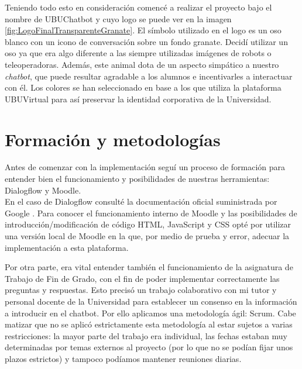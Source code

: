 Teniendo todo esto en consideración comencé a realizar el proyecto bajo el nombre de UBUChatbot y cuyo logo se puede ver en la imagen \ref{fig:LogoFinalTransparenteGranate}. El símbolo utilizado en el logo es un oso blanco con un icono de conversación sobre un fondo granate. Decidí utilizar un oso ya que era algo diferente a las siempre utilizadas imágenes de robots o teleoperadoras. Además, este animal dota de un aspecto simpático a nuestro \textit{chatbot}, que puede resultar agradable a los alumnos e incentivarles a interactuar con él. Los colores se han seleccionado en base a los que utiliza la plataforma UBUVirtual para así preservar la identidad corporativa de la Universidad.

\newpage

\section{Formación y metodologías}

Antes de comenzar con la implementación seguí un proceso de formación para entender bien el funcionamiento y posibilidades de nuestras herramientas: Dialogflow y Moodle. \\
En el caso de Dialogflow consulté la documentación oficial suministrada por Google \cite{DialogflowDocs}. Para conocer el funcionamiento interno de Moodle y las posibilidades de introducción/modificación de código HTML, JavaScript y CSS opté por utilizar una versión local de Moodle en la que, por medio de prueba y error, adecuar la implementación a esta plataforma.

Por otra parte, era vital entender también el funcionamiento de la asignatura de Trabajo de Fin de Grado, con el fin de poder implementar correctamente las preguntas y respuestas. Esto precisó un trabajo colaborativo con mi tutor y personal docente de la Universidad para establecer un consenso en la información a introducir en el chatbot. Por ello aplicamos una metodología ágil: Scrum. Cabe matizar que no se aplicó estrictamente esta metodología al estar sujetos a varias restricciones: la mayor parte del trabajo era individual, las fechas estaban muy determinadas por temas externos al proyecto (por lo que no se podían fijar unos plazos estrictos) y tampoco podíamos mantener reuniones diarias.

